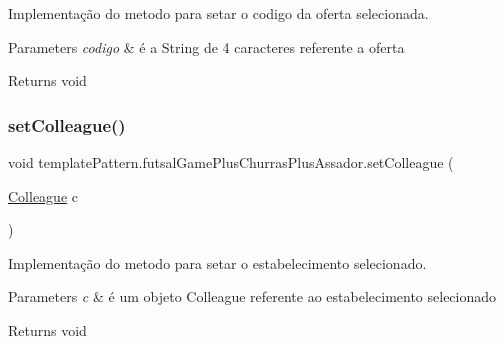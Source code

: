Implementação do metodo para setar o codigo da oferta selecionada. 


\begin{DoxyParams}{Parameters}
{\em codigo} & é a String de 4 caracteres referente a oferta \\
\hline
\end{DoxyParams}
\begin{DoxyReturn}{Returns}
void 
\end{DoxyReturn}
\mbox{\label{classtemplate_pattern_1_1futsal_game_plus_churras_plus_assador_a041a98734fa1bdef2076cfcefbc88eaa}} 
\subsubsection{\texorpdfstring{setColleague()}{setColleague()}}
{\footnotesize\ttfamily void template\+Pattern.\+futsal\+Game\+Plus\+Churras\+Plus\+Assador.\+set\+Colleague (\begin{DoxyParamCaption}\item[{\mbox{\hyperlink{classmediator_pattern_1_1_colleague}{Colleague}}}]{c }\end{DoxyParamCaption})}



Implementação do metodo para setar o estabelecimento selecionado. 


\begin{DoxyParams}{Parameters}
{\em c} & é um objeto Colleague referente ao estabelecimento selecionado \\
\hline
\end{DoxyParams}
\begin{DoxyReturn}{Returns}
void 
\end{DoxyReturn}
\mbox{\label{classtemplate_pattern_1_1futsal_game_plus_churras_plus_assador_ad251d901e2f506fc962ba2f0a7c5711b}} 
